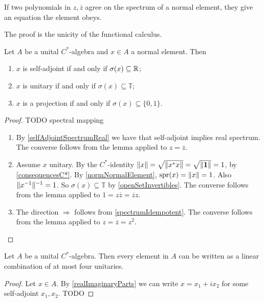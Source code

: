 \begin{lemma}
If two polynomials in $z,\overline{z}$ agree on the spectrum of a normal element, they give an equation the element obeys.
\end{lemma}
The proof is the unicity of the functional calculus.
\begin{corollary} \label{propertiesFromSpectrum}
Let $A$ be a unital $C^*$-algebra and $x\in A$ a normal element. Then
\begin{enumerate}
\item $x$ is self-adjoint \textup{if and only if} $\sigma(x)\subseteq \mathbb{R}$;
\item $x$ is unitary \textup{if and only if} $\sigma(x)\subseteq \mathbb{T}$;
\item $x$ is a projection \textup{if and only if} $\sigma(x)\subseteq \{0,1\}$.
\end{enumerate}
\end{corollary}
\begin{proof}
\hspace{1em} TODO spectral mapping
\begin{enumerate}
\item By \ref{selfAdjointSpectrumReal} we have that self-adjoint implies real spectrum. The converse follows from the lemma applied to $z = \overline{z}$.
\item Assume $x$ unitary. By the $C^*$-identity $\lVert x\rVert = \sqrt{\lVert x^*x\rVert} = 
\sqrt{\lVert\boldsymbol{\mathrm{1}}\rVert} = 1$, by \ref{consequencesC*}. By \ref{normNormalElement}, $\operatorname{spr}(x) = \lVert x\rVert = 1$. Also $\lVert x^{-1}\rVert^{-1} = 1$. So $\sigma(x)\subseteq \mathbb{T}$ by \ref{openSetInvertibles}. The converse follows from the lemma applied to $1 = z\overline{z} = \overline{z}z$.
\item The direction $\Rightarrow$ follows from \ref{spectrumIdempotent}.
The converse follows from the lemma applied to $z = \overline{z} = z^2$.
\end{enumerate}
\end{proof}



\begin{proposition}
Let $A$ be a unital $C^*$-algebra. Then every element in $A$ can be written as a linear combination of at most four unitaries.
\end{proposition}
\begin{proof}
Let $x\in A$. By \ref{realImaginaryParts} we can write $x=x_1+ix_2$ for some self-adjoint $x_1,x_2$.
TODO
\end{proof}


